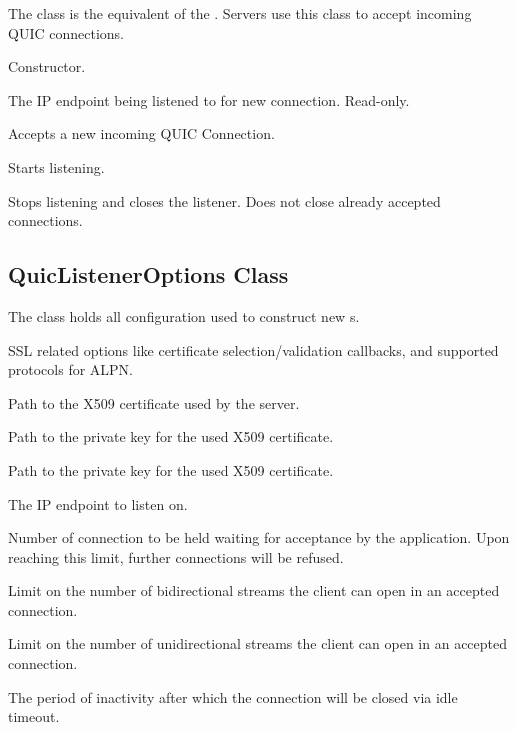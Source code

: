 The  class is the equivalent of the . Servers use this
class to accept incoming QUIC connections.

\begin{description}

     Constructor.

     The IP endpoint being listened to for new connection. Read-only.

    Accepts a new incoming QUIC Connection.

     Starts listening.

     Stops listening and closes the listener. Does not close already accepted connections.

\end{description}

\subsection{QuicListenerOptions Class}

The  class holds all configuration used to construct new s.

\begin{description}

        SSL related options like certificate selection/validation callbacks, and supported protocols for ALPN\@.

     Path to the X509 certificate used by the server.

     Path to the private key for the used X509 certificate.

     Path to the private key for the used X509 certificate.

     The IP endpoint to listen on.

     Number of connection to be held waiting for acceptance by the application. Upon reaching this limit, further connections will be refused.

     Limit on the number of bidirectional streams the client can open in an accepted connection.

     Limit on the number of unidirectional streams the client can open in an accepted connection.

     The period of inactivity after which the connection will be closed via idle timeout.

\end{description}

